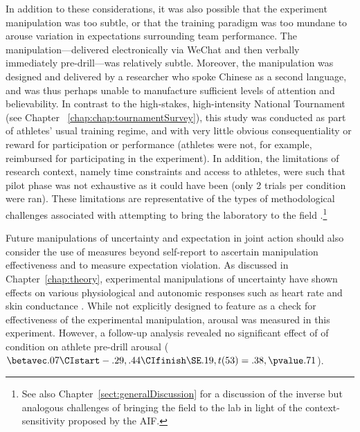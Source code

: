 In addition to these considerations, it was also possible that the experiment manipulation was too subtle, or that the training paradigm was too mundane to arouse variation in expectations surrounding team performance.  The manipulation---delivered electronically via WeChat and then verbally immediately pre-drill—was relatively subtle.  Moreover, the manipulation was designed and delivered by a researcher who spoke Chinese as a second language, and was thus perhaps unable to manufacture sufficient levels of attention and believability.  In contrast to the high-stakes, high-intensity National Tournament (see Chapter ~\ref{chap:chap:tournamentSurvey}), this study was conducted as part of athletes’ usual training regime, and with very little obvious consequentiality or reward for participation or performance (athletes were not, for example,  reimbursed for participating in the experiment).  In addition, the limitations of research context, namely time constraints and access to athletes, were such that pilot phase was not exhaustive as it could have been (only 2 trials per condition were ran).  These limitations are representative of the types of methodological challenges associated with attempting to bring the laboratory to the field \citep{Xygalatas2012}.\footnote{See also Chapter~\ref{sect:generalDiscussion} for a discussion of the inverse but analogous challenges of bringing the field to the lab in light of the context-sensitivity proposed by the AIF.}

Future manipulations of uncertainty and expectation in joint action should also consider the use of measures beyond self-report to ascertain manipulation effectiveness and to measure expectation violation.  As discussed in Chapter~\ref{chap:theory}, experimental manipulations of uncertainty have shown effects on various physiological and autonomic responses such as heart rate \citep{Averill1972} and skin conductance \citep{Epstein1970}. While not explicitly designed to feature as a check for effectiveness of the experimental manipulation, arousal was measured in this experiment.  However,  a follow-up analysis revealed no significant effect of of condition on athlete pre-drill arousal  ($\betavec .07 \CIstart -.29, .44 \CIfinish \SE .19, t(53)= .38, \pvalue .71$).

